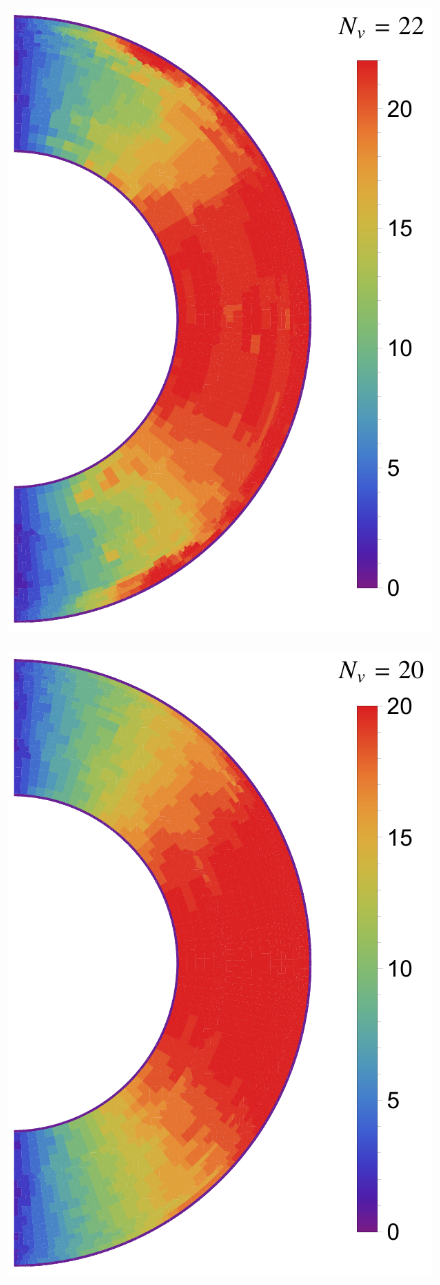 \documentclass[extra,referee]{gji}
\begin{document}
\begin{figure}
  \centering
  \begin{minipage}{0.4\textwidth}
    \centering
    \includegraphics[height=.9\textwidth]{fig/model/s3nv.pdf} 
    \label{fig:s3nv}\par \medskip \vfill
    \includegraphics[height=.9\textwidth]{fig/model/s2nv.pdf} 

\end{minipage}
\end{figure}
\end{document}
